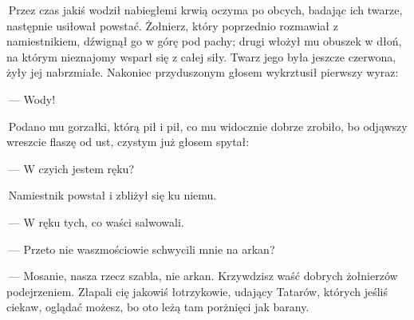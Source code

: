  Przez czas jakiś wodził nabiegłemi krwią oczyma po obcych, badając ich twarze, następnie usiłował powstać. Żołnierz, który poprzednio rozmawiał z namiestnikiem, dźwignął go w górę pod pachy; drugi włożył mu obuszek w dłoń, na którym nieznajomy wsparł się z całej siły. Twarz jego była jeszcze czerwona, żyły jej nabrzmiałe. Nakoniec przyduszonym głosem wykrztusił pierwszy wyraz:

 — Wody!

 Podano mu gorzałki, którą pił i pił, co mu widocznie dobrze zrobiło, bo odjąwszy wreszcie flaszę od ust, czystym już głosem spytał:

 — W czyich jestem ręku?

 Namiestnik powstał i zbliżył się ku niemu.

 — W ręku tych, co waści salwowali.

 — Przeto nie waszmościowie schwycili mnie na arkan?

 — Mosanie, nasza rzecz szabla, nie arkan. Krzywdzisz waść dobrych żołnierzów podejrzeniem. Złapali cię jakowiś łotrzykowie, udający Tatarów, których jeśliś ciekaw, oglądać możesz, bo oto leżą tam porżnięci jak barany.
